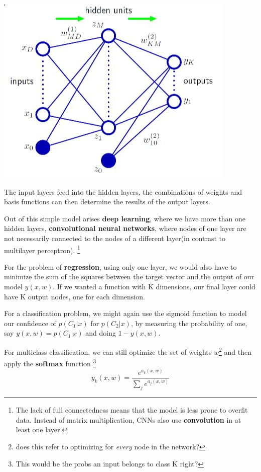 \documentclass{tufte-handout}
\begin{document}
\begin{marginfigure}
		\includegraphics[scale=0.3]{neural_networks}
		\caption{The input layers feed into the hidden layers,
		the combinations of weights and basis functions can then
		determine the results of the output layers.}
\end{marginfigure}

Out of this simple model arises \textbf{deep learning}, where we have 
more than one hidden layers, \textbf{convolutional neural networks},
where nodes of one layer are not necessarily connected to the nodes
of a different layer(in contrast to multilayer perceptron).
\footnote{The lack of full connectedness means that the model is less prone to
overfit data. Instead of matrix multiplication, CNNs also use \textbf{convolution}
in at least one layer.}

For the problem of \textbf{regression}, using only one layer, we would also have to
minimize the sum of the squares between the target vector and the output of our model
$y(x, w)$. If we wanted a function with K dimensions, our final layer could have K 
output nodes, one for each dimension. 

For a classification problem, we might again use the sigmoid function to model 
our confidence of $p(C_{1}|x)$ for $p(C_{2}|x)$, by measuring the probability of one,
say $y(x,w) = p(C_{1}|x)$ and doing $1- y(x, w)$.

For multiclass classification, we can still optimize the set of weights $w$\footnote{does
this refer to optimizing for \emph{every} node in the network?} and then apply the 
\textbf{softmax} function \footnote{This would be the probs an input belongs to class K right?}
\[ y_{k}(x, w) = \frac{e^{a_{k}(x,w)}}{\sum_{j}^{}e^{a_{j}(x, w)}}\]
\end{document}

